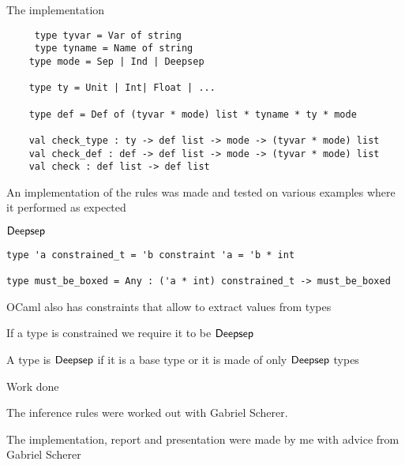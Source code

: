 \documentclass[svgnames]{beamer}
\begin{document}
\begin{frame}{The implementation}

	\begin{lstlisting}
 	 type tyvar = Var of string
 	 type tyname = Name of string
  	type mode = Sep | Ind | Deepsep

	type ty = Unit | Int| Float | ...

	type def = Def of (tyvar * mode) list * tyname * ty * mode

	val check_type : ty -> def list -> mode -> (tyvar * mode) list
	val check_def : def -> def list -> mode -> (tyvar * mode) list
	val check : def list -> def list
	\end{lstlisting}
	
	An implementation of the rules was made and tested on various examples where it performed as expected

\end{frame}

\begin{frame}[fragile]{$\mathsf{Deepsep}$}

\begin{lstlisting}
type 'a constrained_t = 'b constraint 'a = 'b * int

type must_be_boxed = Any : ('a * int) constrained_t -> must_be_boxed
\end{lstlisting}

	\vfill
	
	OCaml also has constraints that allow to extract values from types
	
	\vfill
	
	If a type is constrained we require it to be $\mathsf{Deepsep}$
	
	\vfill
	
	A type is $\mathsf{Deepsep}$ if it is a base type or it is made of only $\mathsf{Deepsep}$ types

\end{frame}

\begin{frame}{Work done}

	The inference rules were worked out with Gabriel Scherer.
	
	\vfill
	
	The implementation, report and presentation were made by me with advice from Gabriel Scherer

\end{frame}
\end{document}
